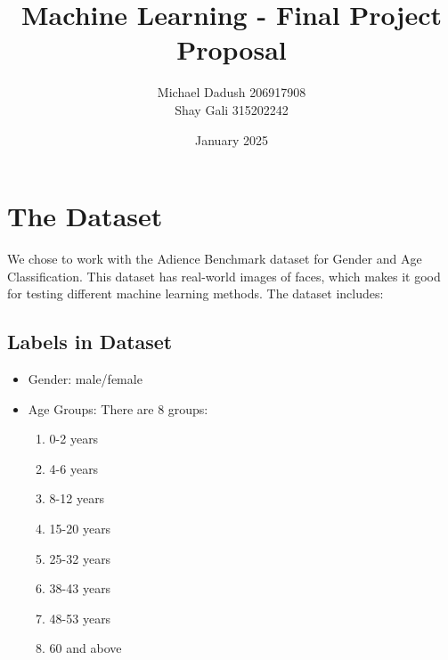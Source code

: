 \documentclass[a4paper,12pt]{article}
\title{Machine Learning - Final Project Proposal}
\author{Michael Dadush 206917908 \\ Shay Gali 315202242}
\date{January 2025}
\begin{document}
\maketitle

\section{The Dataset}
We chose to work with the Adience Benchmark dataset for Gender and Age Classification\cite{adience_dataset}. This dataset has real-world images of faces, which makes it good for testing different machine learning methods. The dataset includes:


\subsection*{Labels in Dataset}
\begin{itemize}[leftmargin=1.5cm]
    \item Gender: male/female
    \item Age Groups: There are 8 groups:
    \begin{enumerate}
        \item 0-2 years
        \item 4-6 years
        \item 8-12 years
        \item 15-20 years
        \item 25-32 years
        \item 38-43 years
        \item 48-53 years
        \item 60 and above
    \end{enumerate}
\end{itemize}
\end{document}
